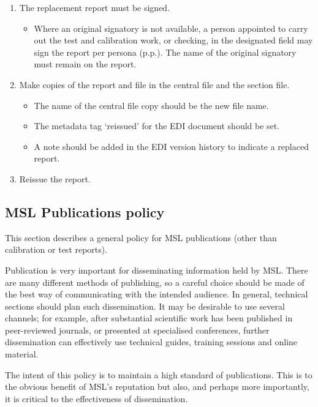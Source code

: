 {\begin{enumerate}
\item The replacement report must be signed.
\begin{itemize}
\item Where an original signatory is not available, a person appointed to carry out the test and calibration work, or checking, in the designated field may sign the report per persona (p.p.).  The name of the original signatory must remain on the report.
\end{itemize}

\item Make copies of the report and file in the central file and the section file.
\begin{itemize}
\item The name of the central file copy should be the new file name. 
\item The metadata tag ‘reissued’ for the EDI document should be set.
\item A note should be added in the EDI version history to indicate a replaced report.
\end{itemize}
\item Reissue the report.

\end{enumerate}


}

\subsection{MSL Publications policy}
\label{ss:msl_publications_policy}

This section describes a general policy for MSL publications (other than calibration or test reports). 

Publication is very important for disseminating information held by MSL. There are many different methods of publishing, so a careful choice should be made of the best way of communicating with the intended audience. In general, technical sections should plan such dissemination. It may be desirable to use several channels; for example, after substantial scientific work has been published in peer-reviewed journals, or presented at specialised conferences, further dissemination can effectively use technical guides, training sessions and online material. 

The intent of this policy is to maintain a high standard of publications. This is to the obvious benefit of MSL’s reputation but also, and perhaps more importantly, it is critical to the effectiveness of dissemination. 

